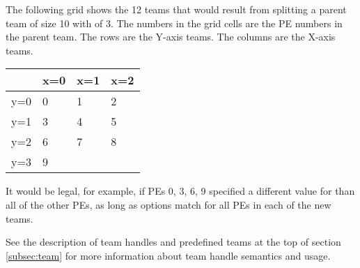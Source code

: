 \begin{apidefinition}
{The following grid shows the 12 teams that would result from splitting a parent team
of size 10 with  of 3. The numbers in the grid cells are the \ac{PE} numbers
in the parent team. The rows are the Y-axis teams. The columns are the X-axis teams.

\begin{center}
\begin{tabular}{|l|l|l|l|}
 \hline
      & x=0 & x=1 & x=2  \\ \hline
 y=0  & 0   & 1   & 2  \\ \hline
 y=1  & 3   & 4   & 5  \\ \hline
 y=2  & 6   & 7   & 8  \\ \hline
 y=3  & 9     \\
 \cline{0-1} 
\end{tabular}
\end{center}

It would be legal, for example, if \acp{PE} 0, 3, 6, 9 specified a different value
for  than all of the other \acp{PE}, as long as options match
for all \acp{PE} in each of the new teams.

See the description of team handles and predefined teams at the top of section
\ref{subsec:team} for more information about team handle semantics and usage.
}

\begin{apiexamples}

\end{apiexamples}

\end{apidefinition}
